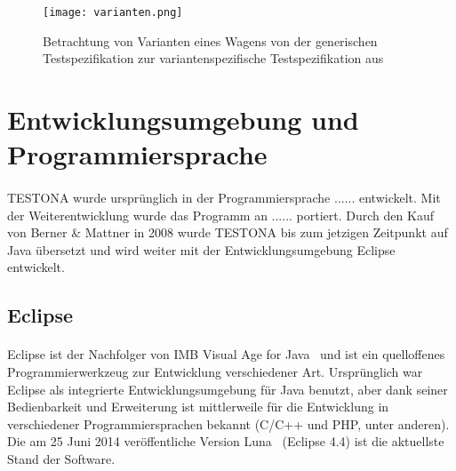 \begin{figure}[h]
  \begin{center}
    \texttt{[image: varianten.png]}
  		  \caption{Betrachtung von Varianten eines Wagens von der generischen Testspezifikation zur variantenspezifische Testspezifikation aus \cite{VarMan1}}
     \label{doors.bespiel}
  \end{center}
\end{figure}


\newpage
\section{Entwicklungsumgebung und Programmiersprache}
\paragraph{}
TESTONA wurde ursprünglich in der Programmiersprache ...... entwickelt. Mit der Weiterentwicklung wurde das Programm an ...... portiert. Durch den Kauf von Berner \& Mattner in 2008 wurde TESTONA bis zum jetzigen Zeitpunkt auf Java übersetzt und wird weiter mit der Entwicklungsumgebung Eclipse entwickelt.

\subsection{Eclipse}
\paragraph{}
Eclipse ist der Nachfolger von \glqq IMB Visual Age for Java\grqq~ und ist ein quelloffenes Programmierwerkzeug zur Entwicklung verschiedener Art. Ursprünglich war Eclipse als integrierte Entwicklungsumgebung für Java benutzt, aber dank seiner Bedienbarkeit und Erweiterung ist mittlerweile für die Entwicklung in verschiedener Programmiersprachen bekannt (C/C++ und PHP, unter anderen). Die am 25 Juni 2014 veröffentliche Version \glqq Luna\grqq~ (Eclipse 4.4) ist die aktuellste Stand der Software. \\

